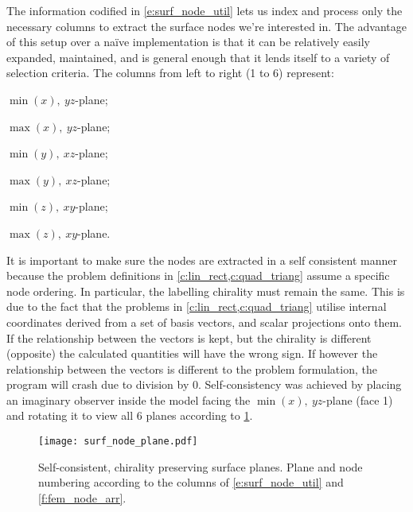 		The information codified in \cref{e:surf_node_util} lets us index and process only the necessary columns to extract the surface nodes we're interested in. The advantage of this setup over a naïve implementation is that it can be relatively easily expanded, maintained, and is general enough that it lends itself to a variety of selection criteria. The columns from left to right (1 to 6) represent: 
		\begin{inparaenum}
			\item $ \min(x),~ yz $-plane;
			\item $ \max(x),~ yz $-plane;
			\item $ \min(y),~ xz $-plane;
			\item $ \max(y),~ xz $-plane;
			\item $ \min(z),~ xy $-plane;
			\item $ \max(z),~ xy $-plane.
		\end{inparaenum} 
		
		It is important to make sure the nodes are extracted in a self consistent manner because the problem definitions in \cref{c:lin_rect,c:quad_triang} assume a specific node ordering. In particular, the labelling chirality must remain the same. This is due to the fact that the problems in \cref{c:lin_rect,c:quad_triang} utilise internal coordinates derived from a set of basis vectors, and scalar projections onto them. If the relationship between the vectors is kept, but the chirality is different (opposite) the calculated quantities will have the wrong sign. If however the relationship between the vectors is different to the problem formulation, the program will crash due to division by 0. Self-consistency was achieved by placing an imaginary observer inside the  model facing the $ \min(x),~ yz $-plane (face 1) and rotating it to view all 6 planes according to \cref{f:surf_node_plane}.
		\begin{figure}
			\centering
			\texttt{[image: surf\_node\_plane.pdf]}
			\caption[Self-consistent, chirality preserving surface planes.]{Self-consistent, chirality preserving surface planes. Plane and node numbering according to the columns of \cref{e:surf_node_util} and \cref{f:fem_node_arr}.}
			\label{f:surf_node_plane}
		\end{figure}
		
		
